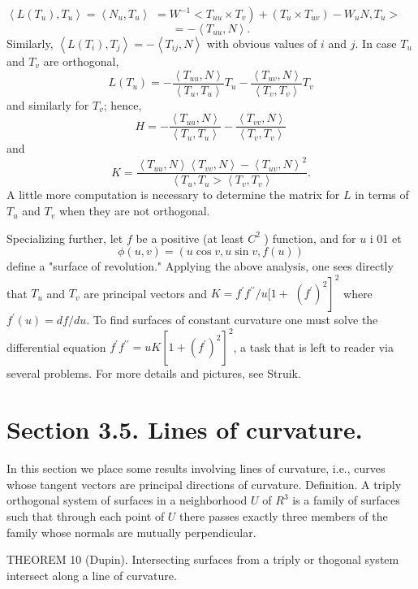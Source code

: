 \documentclass[10pt]{article}
\begin{document}
$\left\langle L\left(T_{u}\right), T_{u}\right\rangle=\left\langle N_{u}, T_{u}\right\rangle$ $\left.=W^{-1}<T_{u u} \times T_{v}\right)+\left(T_{u} \times T_{u v}\right)-W_{u} N, T_{u}>$
$$
=-\left\langle T_{u u}, N\right\rangle .
$$
Similarly, $\left\langle L\left(T_{i}\right), T_{j}\right\rangle=-\left\langle T_{i j}, N\right\rangle$ with obvious values of $i$ and $j$. In case $T_{u}$ and $T_{v}$ are orthogonal,
$$
L\left(T_{u}\right)=-\frac{\left\langle T_{u u}, N\right\rangle}{\left\langle T_{u}, T_{u}\right\rangle} T_{u}-\frac{\left\langle T_{u v}, N\right\rangle}{\left\langle T_{v}, T_{v}\right\rangle} T_{v}
$$
and similarly for $T_{v}$; hence,
$$
H=-\frac{\left\langle T_{u u}, N\right\rangle}{\left\langle T_{u}, T_{u}\right\rangle}-\frac{\left\langle T_{v v}, N\right\rangle}{\left\langle T_{v}, T_{v}\right\rangle}
$$
and
$$
K=\frac{\left\langle T_{u u}, N\right\rangle\left\langle T_{v v}, N\right\rangle-\left\langle T_{u v}, N\right\rangle^{2}}{\left\langle T_{u}, T_{u}>\left\langle T_{v}, T_{v}\right\rangle\right.} .
$$
A little more computation is necessary to determine the matrix for $L$ in terms of $T_{u}$ and $T_{v}$ when they are not orthogonal.

Specializing further, let $f$ be a positive (at least $C^{2}$ ) function, and for $u$ i 01 et
$$
\phi(u, v)=(u \cos v, u \sin v, f(u))
$$
define a "surface of revolution." Applying the above analysis, one sees directly that $T_{u}$ and $T_{v}$ are principal vectors and $K=f^{\prime} f^{\prime \prime} / u[1+$ $\left.\left(f^{\prime}\right)^{2}\right]^{2}$ where $f^{\prime}(u)=d f / d u$. To find surfaces of constant curvature one must solve the differential equation $f^{\prime} f^{\prime \prime}=u K\left[1+\left(f^{\prime}\right)^{2}\right]^{2}$, a task that is left to reader via several problems. For more details and pictures, see Struik.

\section{Section 3.5. Lines of curvature.}
In this section we place some results involving lines of curvature, i.e., curves whose tangent vectors are principal directions of curvature. Definition. A triply orthogonal system of surfaces in a neighborhood $U$ of $R^{3}$ is a family of surfaces such that through each point of $U$ there passes exactly three members of the family whose normals are mutually perpendicular.

THEOREM 10 (Dupin). Intersecting surfaces from a triply or thogonal system intersect along a line of curvature.
\end{document}
